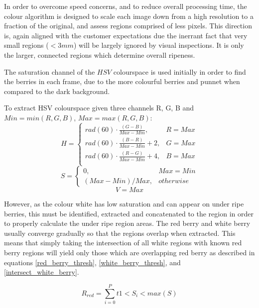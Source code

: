 \documentclass[fleqn,twoside,12pt]{report}
\begin{document}
In order to overcome speed concerns, and to reduce overall processing time, the colour algorithm is designed to scale each image down from a high resolution to a fraction of the original, and assess regions comprised of less pixels. This direction is, again aligned with the customer expectations due the inerrant fact that very small regions ($<3mm$) will be largely ignored by visual inspections. It is only the larger, connected regions which determine overall ripeness.

The saturation channel of the $HSV$ colourspace is used initially in order to find the berries in each frame, due to the more colourful berries and punnet when compared to the dark background. 

To extract HSV colourspace given three channels R, G, B and $Min = min(R, G, B)$, $Max = max(R, G, B)$:
\begin{equation}
H = 
\begin{cases} 
rad(60) \cdot \frac{(G-B)}{Max-Min}, & R=Max \\
rad(60) \cdot \frac{(B-R)}{Max-Min} + 2, & G=Max \\
rad(60) \cdot \frac{(R-G)}{Max-Min} + 4, & B=Max \\   
\end{cases}
\end{equation}
\begin{equation}
S = 
\begin{cases} 
0, & Max=Min \\   
(Max-Min)/Max, & otherwise        
\end{cases}
\end{equation}
\begin{equation}
V = Max
\end{equation}


However, as the colour white has low saturation and can appear on under ripe berries, this must be identified, extracted and concatenated to the region in order to properly calculate the under ripe region areas. The red berry and white berry usually converge gradually so that the regions overlap when extracted. This means that simply taking the intersection of all white regions with known red berry regions will yield only those which are overlapping red berry as described in equations \ref{red_berry_thresh}, \ref{white_berry_thresh}, and \ref{intersect_white_berry}.

\begin{equation}
R_{red} = \sum_{i=0}^{P}t1<S_i<max(S)
\label{red_berry_thresh}
\end{equation}
\end{document}
